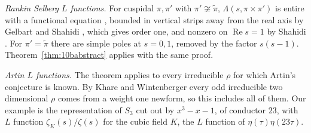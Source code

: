 \emph{Rankin Selberg $L$ functions.} For cuspidal $\pi,\pi'$ with $\pi'\not\cong\tilde\pi$, $\Lambda(s,\pi\times\pi')$ is entire with a functional equation \cite{jpss1983,moeglinwaldspurger1989}, bounded in vertical strips away from the real axis by Gelbart and Shahidi \cite{gelbartshahidi2001}, which gives order one, and nonzero on $\operatorname{Re}s=1$ by Shahidi \cite{shahidi1981}. For $\pi' = \tilde\pi$ there are simple poles at $s=0,1$, removed by the factor $s(s-1)$. Theorem~\ref{thm:10babstract} applies with the same proof.

\emph{Artin $L$ functions.} The theorem applies to every irreducible $\rho$ for which Artin's conjecture is known. By Khare and Wintenberger \cite{kharewintenberger2009} every odd irreducible two dimensional $\rho$ comes from a weight one newform, so this includes all of them. Our example is the representation of $S_3$ cut out by $x^3-x-1$, of conductor $23$, with $L$ function $\zeta_K(s)/\zeta(s)$ for the cubic field $K$, the $L$ function of $\eta(\tau)\eta(23\tau)$.


